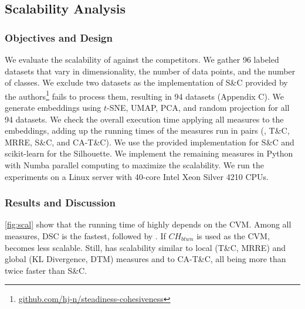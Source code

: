 \subsection{Scalability Analysis}


\label{sec:scaleval}

\subsubsection{Objectives and Design}

We evaluate the scalability of \ltc against the competitors. 
We gather 96 labeled datasets \cite{jeon22arxiv2} that vary in dimensionality,  the number of data points, and the number of classes. We exclude two datasets as the implementation of S\&C provided by the authors\footnote{\href{https://github.com/hj-n/steadiness-cohesiveness}{github.com/hj-n/steadiness-cohesiveness}} fails to process them, resulting in 94 datasets (Appendix C).
We generate embeddings using $t$-SNE, UMAP, PCA, and random projection for all 94 datasets.
We check the overall execution time applying all measures to the embeddings, adding up the running times of the measures run in pairs (\ltc, T\&C, MRRE, S\&C, and CA-T\&C). We use the provided implementation for S\&C and scikit-learn \cite{pedregosa11jmlr} for the Silhouette.  We implement the remaining measures in Python with Numba parallel computing \cite{lam15llvm} to maximize the scalability.
We run the experiments on a Linux server with 40-core Intel Xeon Silver 4210 CPUs.

\subsubsection{Results and Discussion}

\autoref{fig:scal} show that the running time of \ltc highly depends on the CVM. Among all measures, DSC is the fastest, followed by \ltc [DSC]. If $CH_{btwn}$ is used as the CVM, \ltc becomes less scalable. Still, \ltc [$CH_{btwn}$] has scalability similar to local (T\&C, MRRE) and global (KL Divergence, DTM) measures and to CA-T\&C,  all being more than twice faster than S\&C.

